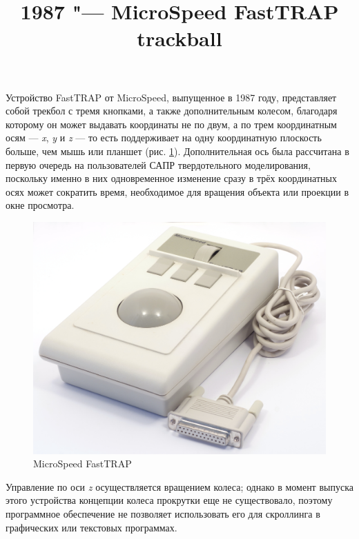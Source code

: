 \documentclass[11pt, a4paper]{article}
\begin{document}
\title{1987 "--- MicroSpeed FastTRAP trackball}
\date{}
\maketitle
{}
Устройство FastTRAP от MicroSpeed, выпущенное в 1987 году, представляет собой трекбол с тремя кнопками, а также дополнительным колесом, благодаря которому он может выдавать координаты не по двум, а по трем координатным осям  — \textit{x}, \textit{y} и \textit{z} — то есть поддерживает на одну координатную плоскость больше, чем мышь или планшет (рис. \ref{fig:FastTRAPPic}). Дополнительная ось была рассчитана в первую очередь на пользователей САПР твердотельного моделирования, поскольку именно в них одновременное изменение сразу в трёх координатных осях может сократить время, необходимое для вращения объекта или проекции в окне просмотра.

\begin{figure}[h]
   \centering
    \includegraphics[scale=0.3]{1987_microspeed_fasttrap/pic_15.jpg}
    \caption{MicroSpeed FastTRAP}
    \label{fig:FastTRAPPic}
\end{figure}

Управление по оси \textit{z} осуществляется вращением колеса; однако в момент выпуска этого устройства концепции колеса прокрутки еще не существовало, поэтому программное обеспечение не позволяет использовать его для скроллинга в графических или текстовых программах.
\end{document}
